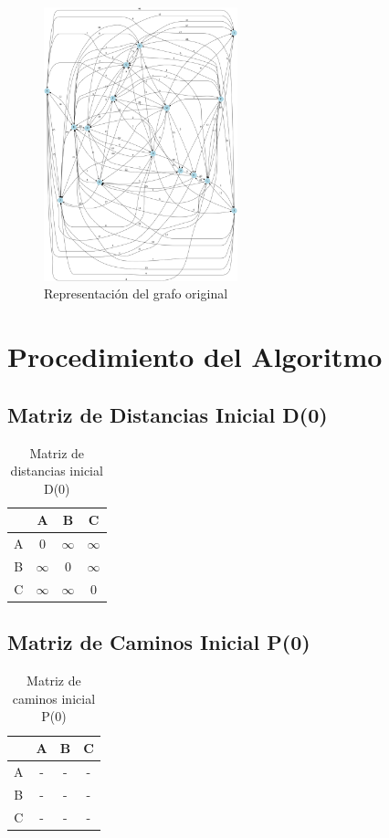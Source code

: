 \documentclass[12pt]{article}
\begin{document}
\begin{figure}[h!]
\centering
\includegraphics[width=0.5\textwidth,keepaspectratio]{grafo.png}
\caption{Representación del grafo original}
\end{figure}

\clearpage
\section{Procedimiento del Algoritmo}
\subsection{Matriz de Distancias Inicial D(0)}
\begin{table}[h!]
\centering
\begin{tabular}{|c|c|c|c|}
\hline
 & A & B & C \\\hline
A & 0 & $\infty$ & $\infty$ \\\hline
B & $\infty$ & 0 & $\infty$ \\\hline
C & $\infty$ & $\infty$ & 0 \\\hline
\end{tabular}
\caption{Matriz de distancias inicial D(0)}
\end{table}

\clearpage
\subsection{Matriz de Caminos Inicial P(0)}
\begin{table}[h!]
\centering
\begin{tabular}{|c|c|c|c|}
\hline
 & A & B & C \\\hline
A & - & - & - \\\hline
B & - & - & - \\\hline
C & - & - & - \\\hline
\end{tabular}
\caption{Matriz de caminos inicial P(0)}
\end{table}
\end{document}
